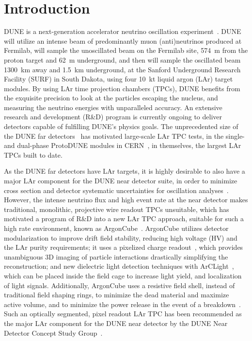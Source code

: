 \section{Introduction}
\label{sec:introduction}

DUNE is a next-generation accelerator neutrino oscillation experiment~\cite{DUNE, DUNE2}. DUNE will utilize an intense beam of predominantly muon (anti)neutrinos produced at Fermilab, will sample the unoscillated beam on the Fermilab site, \SI{574}{\metre} from the proton target and \SI{62}{\metre} underground, and then will sample the oscillated beam \SI{1300}{\kilo\metre} away and \SI{1.5}{\kilo\metre} underground, at the Sanford Underground Research Facility (SURF) in South Dakota, using four \SI{10}{\kilo\tonne} liquid argon (LAr) target modules. By using LAr time projection chambers (TPCs), DUNE benefits from the exquisite precision to look at the particles escaping the nucleus, and measuring the neutrino energies with unparalleled accuracy. An extensive research and development (R\&D) program is currently ongoing to deliver detectors capable of fulfilling DUNE's physics goals. The unprecedented size of the DUNE far detectors~\cite{DUNE_IDR_v1, DUNE_IDR_v2, DUNE_IDR_v3} has motivated large-scale LAr TPC tests, in the single- and dual-phase ProtoDUNE modules in CERN~\cite{Abi:2017aow, Agostino:2014qoa}, in themselves, the largest LAr TPCs built to date.

As the DUNE far detectors have LAr targets, it is highly desirable to also have a major LAr component for the DUNE near detector suite, in order to minimize cross section and detector systematic uncertainties for oscillation analyses~\cite{DUNE, DUNE2}. However, the intense neutrino flux and high event rate at the near detector makes traditional, monolithic, projective wire readout TPCs unsuitable, which has motivated a program of R\&D into a new LAr TPC approach, suitable for such a high rate environment, known as ArgonCube~\cite{argoncube_loi}. ArgonCube utilizes detector modularization to improve drift field stability, reducing high voltage (HV) and the LAr purity requirements; it uses a pixelized charge readout~\cite{pixels, larpix}, which provides unambiguous 3D imaging of particle interactions drastically simplifying the reconstruction; and new dielectric light detection techniques with ArCLight~\cite{arclight}, which can be placed inside the field cage to increase light yield, and localization of light signals. Additionally, ArgonCube uses a resistive field shell, instead of traditional field shaping rings, to minimize the dead material and maximize active volume, and to minimize the power release in the event of a breakdown~\cite{argoncube_fd}. Such an optically segmented, pixel readout LAr TPC has been recommended as the major LAr component for the DUNE near detector by the DUNE Near Detector Concept Study Group~\cite{dune_ndcsg}.

